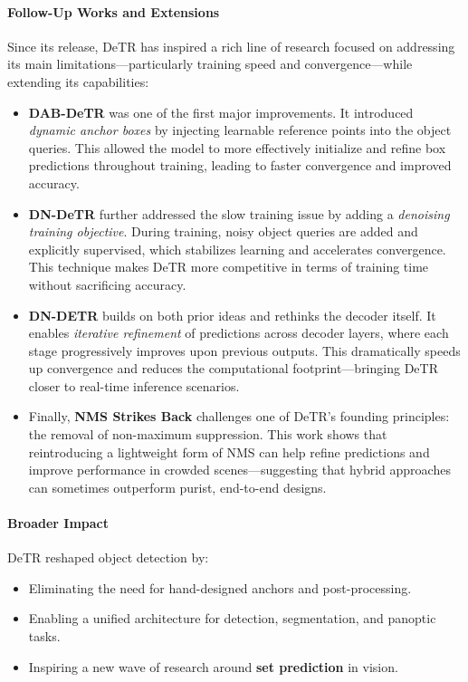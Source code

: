 \begin{enrichment}
\begin{enrichment}
		\paragraph{Follow-Up Works and Extensions}
		
		Since its release, DeTR has inspired a rich line of research focused on addressing its main limitations—particularly training speed and convergence—while extending its capabilities:
		
		\begin{itemize}
			\item \textbf{DAB-DeTR} \cite{liu2022_dab_detr} was one of the first major improvements. It introduced \emph{dynamic anchor boxes} by injecting learnable reference points into the object queries. This allowed the model to more effectively initialize and refine box predictions throughout training, leading to faster convergence and improved accuracy.
			
			\item \textbf{DN-DeTR} \cite{li2022_dn_detr} further addressed the slow training issue by adding a \emph{denoising training objective}. During training, noisy object queries are added and explicitly supervised, which stabilizes learning and accelerates convergence. This technique makes DeTR more competitive in terms of training time without sacrificing accuracy.
			
			\item \textbf{DN-DETR} \cite{li2022_dn_detr} builds on both prior ideas and rethinks the decoder itself. It enables \emph{iterative refinement} of predictions across decoder layers, where each stage progressively improves upon previous outputs. This dramatically speeds up convergence and reduces the computational footprint—bringing DeTR closer to real-time inference scenarios.
			
			\item Finally, \textbf{NMS Strikes Back} \cite{sun2023_nms_strikes_back} challenges one of DeTR’s founding principles: the removal of non-maximum suppression. This work shows that reintroducing a lightweight form of NMS can help refine predictions and improve performance in crowded scenes—suggesting that hybrid approaches can sometimes outperform purist, end-to-end designs.
		\end{itemize}
		
		\paragraph{Broader Impact}
		DeTR reshaped object detection by:
		\begin{itemize}
			\item Eliminating the need for hand-designed anchors and post-processing.
			\item Enabling a unified architecture for detection, segmentation, and panoptic tasks.
			\item Inspiring a new wave of research around \textbf{set prediction} in vision.
		\end{itemize}
		

\end{enrichment}
\end{enrichment}
